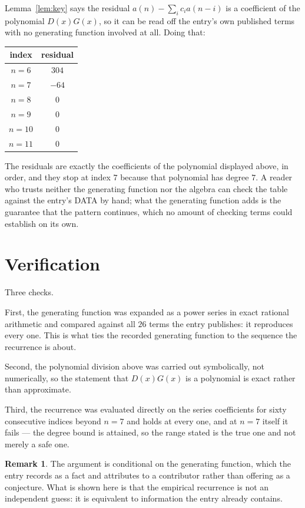\documentclass[11pt,a4paper]{article}
\theoremstyle{plain}
\theoremstyle{definition}
\newtheorem{remark}[theorem]{Remark}
\begin{document}
Lemma~\ref{lem:key} says the residual $a(n)-\sum_ic_ia(n-i)$ is a coefficient of the
polynomial $D(x)G(x)$, so it can be read off the entry's own published terms with no
generating function involved at all. Doing that:
\begin{center}
\begin{tabular}{cc}
index & residual \\ \hline
$n=6$ & $304$ \\
$n=7$ & $-64$ \\
$n=8$ & $0$ \\
$n=9$ & $0$ \\
$n=10$ & $0$ \\
$n=11$ & $0$
\end{tabular}
\end{center}
The residuals are exactly the coefficients of the polynomial displayed above, in order, and
they stop at index $7$ because that polynomial has degree $7$. A reader who trusts
neither the generating function nor the algebra can check the table against the entry's DATA
by hand; what the generating function adds is the guarantee that the pattern continues, which
no amount of checking terms could establish on its own.

\section{Verification}

Three checks.

First, the generating function was expanded as a power series in exact rational arithmetic and
compared against all $26$ terms the entry publishes: it reproduces every one. This is
what ties the recorded generating function to the sequence the recurrence is about.

Second, the polynomial division above was carried out symbolically, not numerically, so the
statement that $D(x)G(x)$ is a polynomial is exact rather than approximate.

Third, the recurrence was evaluated directly on the series coefficients for sixty consecutive
indices beyond $n=7$ and holds at every one, and at $n=7$ itself it fails --- the
degree bound is attained, so the range stated is the true one and not merely a safe one.

\begin{remark}
The argument is conditional on the generating function, which the entry records as a fact and
attributes to a contributor rather than offering as a conjecture. What is shown here is that
the empirical recurrence is not an independent guess: it is equivalent to information the
entry already contains.
\end{remark}
\end{document}
